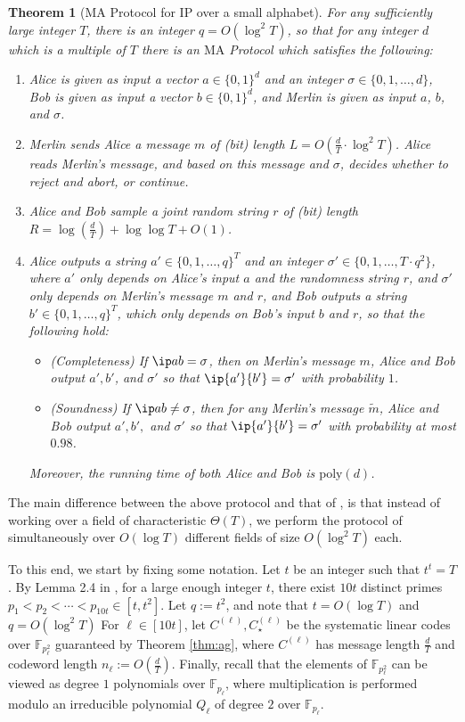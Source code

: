\documentclass[11pt]{article}
\theoremstyle{plain}
\newtheorem{thm}{Theorem}[section]
\theoremstyle{remark}
\newcommand{\F}{\mathbb{F}}
\newcommand{\ma}{\mathrm{MA}}
\newcommand{\IP}{\mathrm{IP}}
\newcommand{\poly}{\mathrm{poly}}
\begin{document}
\begin{thm}[MA Protocol for $\IP$ over a small alphabet]\label{thm:ma} 
For any sufficiently large integer $T$, there is an integer  $q=O(\log ^2 T)$, so that for 
 any integer $d$ which is a multiple of $T$ there is an $\ma$ Protocol which satisfies the following:
\begin{enumerate}
\item Alice is given as input a vector $a \in\{0,1\}^{d}$  and an integer $\sigma \in \{0,1,\ldots,d\}$,
Bob is given as input a vector $b \in \{0,1\}^{d}$, and Merlin is given as input
$a$, $b$, and $\sigma$.
\item Merlin sends Alice a message $m$ of (bit) length $L=O(\frac d T \cdot \log^2 T)$.
 Alice reads Merlin's message, and based on this message and $\sigma$, decides whether to reject and abort, or continue.
\item Alice and Bob sample a joint random string $r$ of (bit) length $R=\log(\frac{d}{T})+ \log \log T+O(1)$.
\item Alice outputs  a string
$a' \in \{0,1,\ldots,q\}^T$ and an integer $\sigma' \in \{0,1,\ldots, T \cdot q^2\}$, where $a'$ only depends on Alice's input $a$ and the randomness string $r$,  
and $\sigma'$ only depends on Merlin's message $m$ and $r$,  and Bob outputs a string $b' \in \{0,1,\ldots,q\}^T$, which only depends on Bob's input $b$ and  $r$, so that the following hold:
\begin{itemize}
\item (Completeness) If $\ip a b= \sigma$, then on Merlin's message $m$, Alice and Bob output $a', b'$, and $\sigma'$ so that $\ip {a'} {b'} = \sigma'$ with probability $1$. 
\item (Soundness) If $\ip a b \neq \sigma$, then for any Merlin's message $\tilde m$, Alice and Bob output $a', b',$ and $\sigma'$ so that $\ip {a'} {b'} = \sigma'$ with probability at most $0.98$.
\end{itemize}

Moreover, the running time of both Alice and Bob is $\poly(d)$.
\end{enumerate}
\end{thm}

The main difference between the above protocol and that of \cite{CW19}, is that instead of working over a field of characteristic $\Theta(T)$, we perform the protocol of \cite{CW19} simultaneously over $O(\log T)$ different fields of size $O(\log^2T)$ each.

To this end, we start by fixing some notation.
Let $t$ be an integer such that $t^t=T$. By Lemma 2.4 in \cite{Che18}, for a large enough integer $t$, there exist $10 t$ distinct primes $p_{1} < p_2<\cdots < p_{10 t} \in [t,t^2]$.
Let $q:=t^2$, and note that $t = O(\log T)$ and $q = O(\log^2T)$
 For $\ell \in [10 t]$, let  $C^{(\ell)}, C_\star^{(\ell)}$  be the systematic linear codes over $\F_{p_\ell^2}$ guaranteed by Theorem \ref{thm:ag}, where $C^{(\ell)}$ has message length $\frac d T$ and codeword length $n_\ell:=O(\frac d T)$. 
 Finally, recall that the elements of $\F_{p_\ell^2}$ can be viewed as degree $1$ polynomials over $\F_{p_\ell}$, where multiplication is performed modulo an irreducible polynomial $Q_\ell$ of degree $2$ over $\F_{p_\ell}$. 
 
\end{document}
